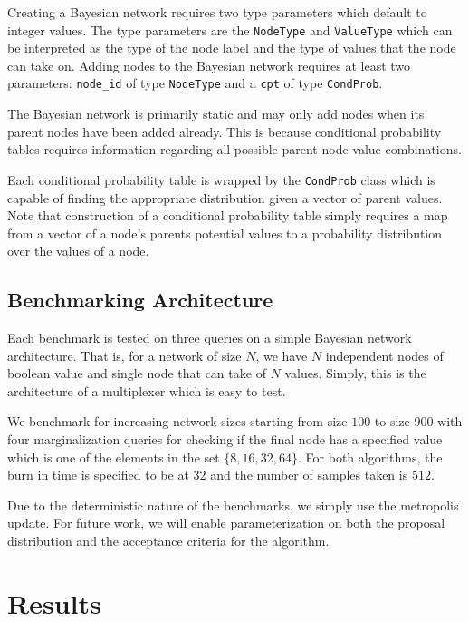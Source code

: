 \documentclass{sig-alternate}
\begin{document}
		Creating a Bayesian network requires two type parameters which
		default to integer values. The type parameters are the
		\lstinline$NodeType$ and \lstinline$ValueType$ which can be
		interpreted as the type of the node label and the type of values
		that the node can take on. Adding nodes to the Bayesian network
		requires at least two parameters: \lstinline$node_id$ of type
		\lstinline$NodeType$ and a \lstinline$cpt$ of type
		\lstinline$CondProb$.

		The Bayesian network is primarily static and may only add nodes
		when its parent nodes have been added already. This is because
		conditional probability tables requires information regarding all
		possible parent node value combinations.
		
		Each conditional probability table is wrapped by the
		\lstinline$CondProb$ class which is capable of finding the
		appropriate distribution given a vector of parent values. Note
		that construction of a conditional probability table simply
		requires a map from a vector of a node's parents potential values
		to a probability distribution over the values of a node.


	\subsection{Benchmarking Architecture} %
	\label{sub:Benchmarking Architecture}
		Each benchmark is tested on three queries on a simple Bayesian network
		architecture. That is, for a network of size $N$, we have $N$ independent
		nodes of boolean value and single node that can take of $N$ values.
		Simply, this is the architecture of a multiplexer which is easy to test.

		We benchmark for increasing network sizes starting from size $100$ to size
		$900$ with four marginalization queries for checking if the final node has
		a specified value which is one of the elements in the set $\{8, 16, 32,
		64\}$. For both algorithms, the burn in time is specified to be at $32$
		and the number of samples taken is $512$.

		Due to the deterministic nature of the benchmarks, we simply use
		the metropolis update. For future work, we will enable
		parameterization on both the proposal distribution and the
		acceptance criteria for the algorithm.


\section{Results} %
\label{sec:Results}
\end{document}

